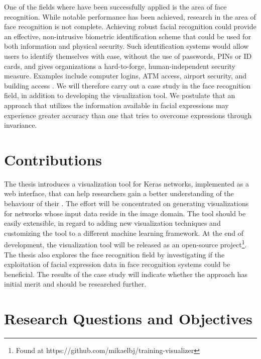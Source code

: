 \noindent One of the fields where  have been successfully applied is the area of face recognition. While notable performance has been achieved, research in the area of face recognition is not complete. Achieving robust facial recognition could provide an effective, non-intrusive biometric identification scheme that could be used for both information and physical security. Such identification systems would allow users to identify themselves with ease, without the use of passwords, PINs or ID cards, and gives organizations a hard-to-forge, human-independent security measure. Examples include computer logins, ATM access, airport security, and building access \cite{application-1, application-2, application-3}. We will therefore carry out a case study in the face recognition field, in addition to developing the visualization tool. We postulate that an approach that utilizes the information available in facial expressions may experience greater accuracy than one that tries to overcome expressions through invariance. \\


\section{Contributions}

The thesis introduces a visualization tool for Keras networks, implemented as a web interface, that can help researchers gain a better understanding of the behaviour of their . The effort will be concentrated on generating visualizations for networks whose input data reside in the image domain. The tool should be easily extensible, in regard to adding new visualization techniques and customizing the tool to a different machine learning framework. At the end of development, the visualization tool will be released as an open-source project\footnote{Found at https://github.com/mikaelbj/training-visualizer}. \\

\noindent The thesis also explores the face recognition field by investigating if the exploitation of facial expression data in face recognition systems could be beneficial. The results of the case study will indicate whether the approach has initial merit and should be researched further.

\section{Research Questions and Objectives} \label{sec:research-questions}

